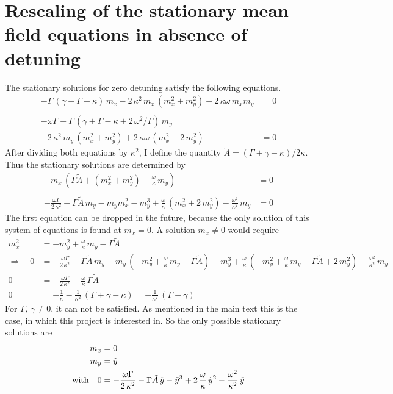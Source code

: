     \section{Rescaling of the stationary mean field equations in absence of detuning}\label{app:rescaling}
    The stationary solutions for zero detuning satisfy the following equations.
    \begin{align*}-\Gamma\,(\gamma+\Gamma-\kappa)\,m_x-2\,\kappa^2\,m_x\,( m_x^2+ m_y^2)+2\,\kappa\omega\,m_xm_y  &=0\\\\
        -\omega\Gamma-\Gamma\,(\gamma+\Gamma-\kappa+2\,\omega^2/\Gamma)\,m_y&\\
         -2\,\kappa^2\,m_y\,( m_x^2+ m_y^2)+2\,\kappa\omega\,(m_x^2+2\,m_y^2)  &=0\label{eq:del0_stat}
     \end{align*}
    After dividing both equations by $\kappa^2$, I define the quantity $\tilde{A}=(\Gamma+\gamma-\kappa)/2\kappa$. Thus the stationary solutions are determined by
\begin{align*}
    -m_x\,\left(\Gamma\tilde{A}+( m_x^2+ m_y^2)-\frac{{\omega}}{{\kappa}}\,m_y\right)  &=0\\\\
    -\frac{{\omega}\Gamma}{{2}\,{\kappa}^2}-\Gamma\tilde{A}\,m_y    -m_ym_x^2- m_y^3+\frac{{\omega}}{{\kappa}}\,(m_x^2+2\,m_y^2)-\frac{{\omega}^2}{{\kappa}^2}\,m_y  &=0
\end{align*}
The first equation can be dropped in the future, because the only solution of this system of equations is found at $m_x=0$. A solution $m_x\neq0$ would require
\begin{align*}
    m_x^2&=-m_y^2+\frac{\omega}{\kappa}\,m_y-\Gamma\tilde{A} \\
    \Rightarrow\quad0&=-\frac{\omega\Gamma}{2\,\kappa^2}-\Gamma\tilde{A}\,m_y    -m_y\,(-m_y^2+\frac{\omega}{\kappa}\,m_y-\Gamma\tilde{A})- m_y^3+\frac{\omega}{\kappa}\,(-m_y^2+\frac{\omega}{\kappa}\,m_y-\Gamma\tilde{A}+2\,m_y^2)-\frac{\omega^2}{\kappa^2}\,m_y  \\
    0&=-\frac{\omega\Gamma}{2\,\kappa^2}-\frac{\omega}{\kappa}\,\Gamma\tilde{A}\\
    0&=-\frac{1}{\kappa}-\frac{1}{\kappa^2}\,(\Gamma+\gamma-{\kappa})=-\frac{1}{\kappa^2}\,(\Gamma+\gamma)
\end{align*} 
For $\Gamma,\,\gamma\neq0$, it can not be satisfied. As mentioned in the main text this is the case, in which this project is interested in. So the only possible stationary solutions are
\begin{align*}
    m_x&=0\\
    m_y&=\tilde{y}\\
    \text{with}\quad0&=-\frac{\omega\Gamma}{2\,\kappa^2}-\Gamma\tilde{A}\,\tilde{y}    - \tilde{y}^3+2\,\frac{\omega}{\kappa}\,\tilde{y}^2-\frac{\omega^2}{\kappa^2}\,\tilde{y}  
\end{align*}
